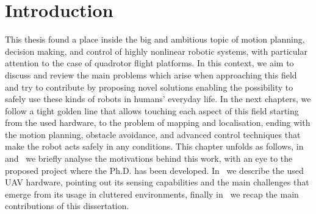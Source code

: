 \chapter{Introduction}%
\label{CH:INTRODUCTION}

This thesis found a place inside the big and ambitious topic of motion planning, decision making, and control of
highly nonlinear robotic systems, with particular attention to the case of quadrotor flight platforms.
In this context, we aim to discuss and review the main problems which arise when approaching this field and try to
contribute by proposing novel solutions enabling the possibility to safely use these kinds of robots in humans' everyday life.
In the next chapters, we follow a tight golden line that allows touching each aspect of this field starting from the
used hardware, to the problem of mapping and localisation, ending with the motion planning, obstacle avoidance, and
advanced control techniques that make the robot acts safely in any conditions.
This chapter unfolds as follows, in~ and~ we briefly analyse the motivations
behind this work, with an eye to the proposed project where the Ph.D. has been developed. In~
we describe the used UAV hardware, pointing out its sensing capabilities and the main challenges that emerge from its usage in
cluttered environments, finally in~ we recap the main contributions of this dissertation.

